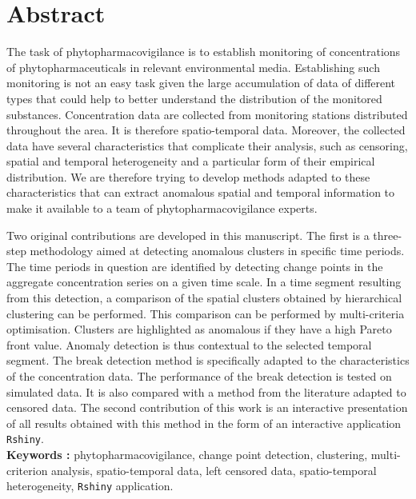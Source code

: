 \section*{Abstract}

The task of phytopharmacovigilance is to establish monitoring of concentrations of phytopharmaceuticals in relevant environmental media. Establishing such monitoring is not an easy task given the large accumulation of data of different types that could help to better understand the distribution of the monitored substances. Concentration data are collected from monitoring stations distributed throughout the area. It is therefore spatio-temporal data. Moreover, the collected data have several characteristics that complicate their analysis, such as censoring, spatial and temporal heterogeneity and a particular form of their empirical distribution. We are therefore trying to develop methods adapted to these characteristics that can extract anomalous spatial and temporal information to make it available to a team of phytopharmacovigilance experts.

Two original contributions are developed in this manuscript. The first is a three-step methodology aimed at detecting anomalous clusters in specific time periods. The time periods in question are identified by detecting change points in the aggregate concentration series on a given time scale. In a time segment resulting from this detection, a comparison of the spatial clusters obtained by hierarchical clustering can be performed. This comparison can be performed by multi-criteria optimisation. Clusters are highlighted as anomalous if they have a high Pareto front value. Anomaly detection is thus contextual to the selected temporal segment. The break detection method is specifically adapted to the characteristics of the concentration data. The performance of the break detection is tested on simulated data. It is also compared with a method from the literature adapted to censored data. The second contribution of this work is an interactive presentation of all results obtained with this method in the form of an interactive application \texttt{Rshiny}. \\

\textbf{Keywords :} phytopharmacovigilance, change point detection, clustering, multi-criterion analysis, spatio-temporal data, left censored data, spatio-temporal heterogeneity, \texttt{Rshiny} application.
